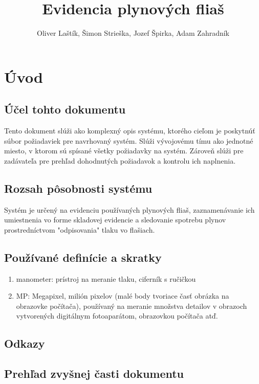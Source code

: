 \documentclass[hreffootnote]{zah}
\title{Evidencia plynových fliaš}
\author{Oliver Laštík, Šimon Strieška, Jozef Špirka, Adam Zahradník}
\begin{document}
\maketitle

\tableofcontents
\cleardoublepage

\section{Úvod}

\subsection{Účel tohto dokumentu}

Tento dokument slúži ako komplexný opis systému, ktorého cieľom je poskytnúť súbor požiadaviek pre navrhovaný systém. Slúži vývojovému tímu ako jednotné miesto, v ktorom sú spísané všetky požiadavky na systém. Zároveň slúži pre zadávateľa pre prehľad dohodnutých požiadavok a kontrolu ich naplnenia.

\subsection{Rozsah pôsobnosti systému}

Systém je určený na evidenciu používaných plynových fliaš, zaznamenávanie ich umiestnenia vo forme skladovej evidencie a sledovanie spotrebu plynov prostredníctvom "odpisovania" tlaku vo flašiach.

\subsection{Používané definície a skratky}

\begin{enumerate}
	\item manometer: prístroj na meranie tlaku, ciferník s ručičkou
 	\item MP: Megapixel, milión pixelov (malé body tvoriace časť obrázka na obrazovke počítača), používaný na meranie množstva detailov v obrazoch vytvorených digitálnym fotoaparátom, obrazovkou počítača atď.
\end{enumerate}

\subsection{Odkazy}

\subsection{Prehľad zvyšnej časti dokumentu}
\end{document}
